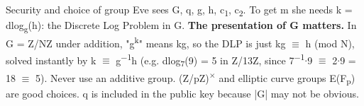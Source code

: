 \documentclass[11pt,a4paper]{article}
\begin{document}
\begin{concept}{Security and choice of group}
Eve sees G, q, g, h, c\textsubscript{1}, c\textsubscript{2}. To get m she needs k = dlog\textsubscript{g}(h): the Discrete Log Problem in G. \textbf{The presentation of G matters.} In G = Z/NZ under addition, "g\textsuperscript{k}" means kg, so the DLP is just kg \ensuremath{\equiv} h (mod N), solved instantly by k \ensuremath{\equiv} g\textsuperscript{\ensuremath{-}1}h (e.g. dlog\textsubscript{7}(9) = 5 in Z/13Z, since 7\textsuperscript{\ensuremath{-}1}\ensuremath{\cdot}9 \ensuremath{\equiv} 2\ensuremath{\cdot}9 = 18 \ensuremath{\equiv} 5). Never use an additive group. (Z/pZ)\textsuperscript{\ensuremath{\times}} and elliptic curve groups E(F\textsubscript{p}) are good choices. q is included in the public key because |G| may not be obvious.\par
\end{concept}
\end{document}
